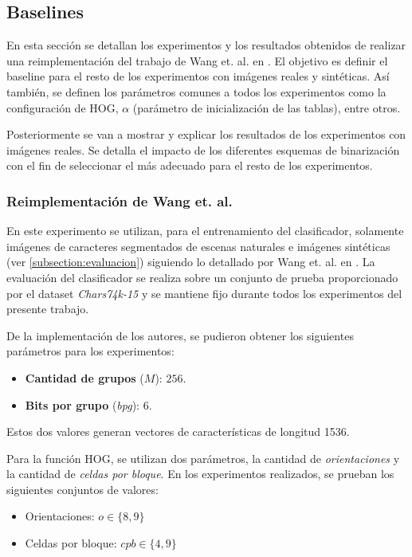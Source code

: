 \subsection{Baselines}
\label{subsection:baseline}

	En esta sección se detallan los experimentos y los resultados obtenidos de realizar una reimplementación del trabajo de Wang et. al. en \cite{wang}. El objetivo es definir el baseline para el resto de los experimentos con imágenes reales y sintéticas. Así también, se definen los parámetros comunes a todos los experimentos como la configuración de HOG, $\alpha$ (parámetro de inicialización de las tablas), entre otros.
	
	Posteriormente se van a mostrar y explicar los resultados de los experimentos con imágenes reales. Se detalla el impacto de los diferentes esquemas de binarización con el fin de seleccionar el más adecuado para el resto de los experimentos.
	
	
\subsubsection{Reimplementación de Wang et. al.}

	En este experimento se utilizan, para el entrenamiento del clasificador, solamente imágenes de caracteres segmentados de escenas naturales e imágenes sintéticas (ver \ref{subsection:evaluacion}) siguiendo lo detallado por Wang et. al. en \cite{wang}. La evaluación del clasificador se realiza sobre un conjunto de prueba proporcionado por el dataset \textit{Chars74k-15} y se mantiene fijo durante todos los experimentos del presente trabajo.
	
	De la implementación de los autores, se pudieron obtener los siguientes parámetros para los experimentos:
	\begin{itemize}
		\item \textbf{Cantidad de grupos} ($M$): $256$.
		\item \textbf{Bits por grupo} (\textit{bpg}): $6$.
	\end{itemize}
	
	Estos dos valores generan vectores de características de longitud 1536.
	
	Para la función HOG,	 se utilizan dos parámetros, la cantidad de \textit{orientaciones} y la cantidad de \textit{celdas por bloque}. En los experimentos realizados, se prueban los siguientes conjuntos de valores:
	
	\begin{itemize}
		\item Orientaciones: $\textit{o} \in \{8, 9\}$
		\item Celdas por bloque: $\textit{cpb} \in \{4, 9\}$
	\end{itemize}
	
